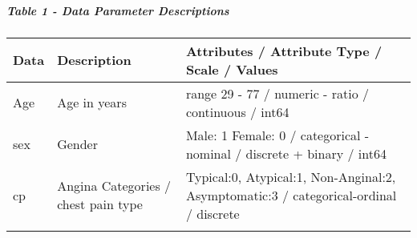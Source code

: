 \documentclass[11pt]{article}
\begin{document}
    \subparagraph{Table 1 - Data Parameter
Descriptions}\label{table-1---data-parameter-descriptions}

\begin{longtable}[]{@{}lll@{}}
\toprule
\begin{minipage}[b]{0.09\columnwidth}\raggedright\strut
Data\strut
\end{minipage} & \begin{minipage}[b]{0.44\columnwidth}\raggedright\strut
Description\strut
\end{minipage} & \begin{minipage}[b]{0.38\columnwidth}\raggedright\strut
Attributes / Attribute Type / Scale / Values\strut
\end{minipage}\tabularnewline
\midrule
\endhead
\begin{minipage}[t]{0.09\columnwidth}\raggedright\strut
Age\strut
\end{minipage} & \begin{minipage}[t]{0.44\columnwidth}\raggedright\strut
Age in years\strut
\end{minipage} & \begin{minipage}[t]{0.38\columnwidth}\raggedright\strut
range 29 - 77 / numeric - ratio / continuous / int64\strut
\end{minipage}\tabularnewline
\begin{minipage}[t]{0.09\columnwidth}\raggedright\strut
sex\strut
\end{minipage} & \begin{minipage}[t]{0.44\columnwidth}\raggedright\strut
Gender\strut
\end{minipage} & \begin{minipage}[t]{0.38\columnwidth}\raggedright\strut
Male: 1 Female: 0 / categorical - nominal / discrete + binary /
int64\strut
\end{minipage}\tabularnewline
\begin{minipage}[t]{0.09\columnwidth}\raggedright\strut
cp\strut
\end{minipage} & \begin{minipage}[t]{0.44\columnwidth}\raggedright\strut
Angina Categories / chest pain type\strut
\end{minipage} & \begin{minipage}[t]{0.38\columnwidth}\raggedright\strut
Typical:0, Atypical:1, Non-Anginal:2, Asymptomatic:3 /
categorical-ordinal / discrete\strut
\end{minipage}\tabularnewline
\begin{minipage}[t]{0.09\columnwidth}\raggedright\strut

\end{minipage}
\end{longtable}
\end{document}
